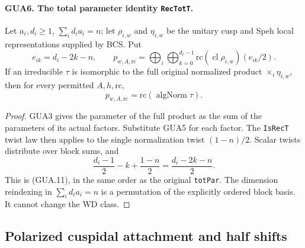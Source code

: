 \documentclass[11pt,a4paper]{article}
\numberwithin{equation}{section}
\theoremstyle{remark}\newtheorem{remark}[theorem]{Remark}
\begin{document}
\paragraph{GUA6. The total parameter identity \texttt{Rec\allowbreak Tot\allowbreak T}.}
\label{claim:GUA6}
Let $a_i,d_i\geq1$, $\sum_i d_i a_i=n$; let
$\rho_{i,w}$ and $\eta_{i,w}$ be the unitary cusp and
Speh local representations supplied by BCS.  Put
\[
 e_{ik}=d_i-2k-n,\qquad
 p_{w,A,\mathrm{rc}}
   =\bigoplus_i\bigoplus_{k=0}^{d_i-1}
                 \mathrm{rc}(\operatorname{cl}\rho_{i,w})(e_{ik}/2).
                                                        \tag{GUA.11}
\]
If an irreducible $\tau$ is isomorphic to the full original
normalized product $\mathop{\times}_i\eta_{i,w}$, then
for every permitted $A,h,\mathrm{rc}$,
\[
                  p_{w,A,\mathrm{rc}}
                       =\mathrm{rc}(\operatorname{algNorm}\tau).
                                                        \tag{GUA.12}
\]
\begin{proof}
GUA3 gives the parameter of the full product as the sum
of the parameters of its actual factors.  Substitute
GUA5 for each factor.  The \texttt{Is\allowbreak Rec\allowbreak T} twist law
then applies to the single normalization twist
$(1-n)/2$.  Scalar twists distribute over block sums,
and
\[
        \frac{d_i-1}{2}-k+\frac{1-n}{2}
                              =\frac{d_i-2k-n}{2}.
\]
This is (GUA.11), in the same order as the original
\texttt{tot\allowbreak Par}.  The dimension reindexing in
$\sum_i d_i a_i=n$ is a permutation of the explicitly
ordered block basis.  It cannot change the WD class.
\end{proof}

\subsection{Polarized cuspidal attachment and half shifts}

\end{document}
